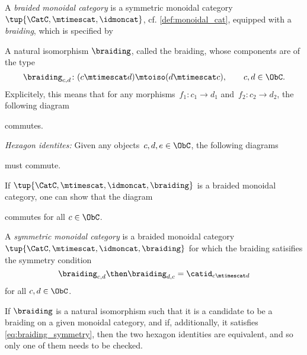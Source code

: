 \begin{ctdefinition}
  A \emph{braided monoidal category} is a symmetric monoidal category~$\tup{\CatC,\mtimescat,\idmoncat}$,  cf. \cref{def:monoidal_cat}, equipped with a \emph{braiding}, which is specified by 
  
  \constit
   \begin{compactenum}
   \item A natural isomorphism $\braiding$, called the braiding, whose components are of the type
   $$\braiding_{c,d}\colon (c\mtimescat d)\mtoiso (d\mtimescat c), \quad \quad c,d \in \ObC.$$
   Explicitely, this means that for any morphisms~$f_1\colon c_1\to d_1$ and~$f_2\colon c_2\to d_2$, the following diagram 
    \begin{center}
    \end{center}
    commutes. 
   \end{compactenum}
  
  \condit
  \begin{compactenum}
    \item \emph{Hexagon identites:} Given any objects~$c,d,e\in \ObC$, the following diagrams 
    \begin{center}
    \end{center}
    \begin{center}
    \end{center}
    must commute.
  \end{compactenum}
\end{ctdefinition}

 \begin{remark} If $\tup{\CatC,\mtimescat,\idmoncat, \braiding}$ is a braided monoidal category, one can show that the diagram 
    \begin{center}
    \end{center}
    commutes for all $c \in \ObC$. 
  \end{remark}

\begin{ctdefinition}
    \label{def:sym-mon-cat}
  A \emph{symmetric monoidal category} is a braided monoidal category~$\tup{\CatC,\mtimescat,\idmoncat, \braiding}$ for which the braiding satisifies the symmetry condition 
 \begin{equation}
     \label{eq:braiding-symmetry}
  \braiding_{c,d} \then \braiding_{d,c} = \catid_{c \mtimescat d}
\end{equation}
  for all $c, d \in \ObC$. 
  \end{ctdefinition}
  
  \begin{remark} If $\braiding$ is a natural isomorphism such that it is a candidate to be a braiding on a given monoidal category, and if, additionally, it satisfies \cref{eq:braiding_symmetry}, then the two hexagon identities are equivalent, and so only one of them needs to be checked. 
 \end{remark}
  
 
